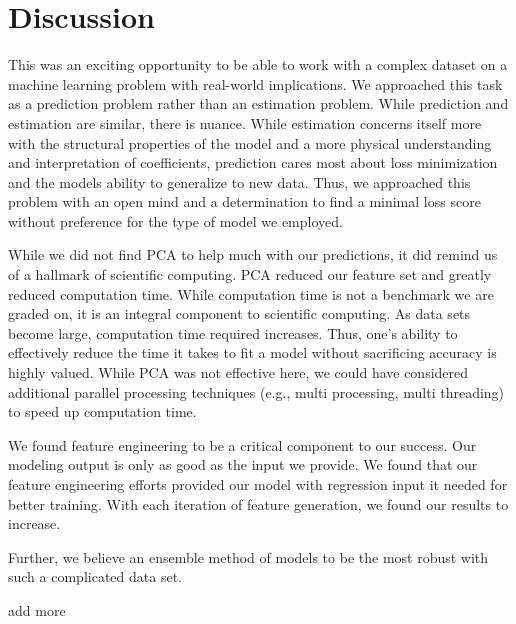 \documentclass[11pt, oneside]{article}   	%
\begin{document}
\section{Discussion}
This was an exciting opportunity to be able to work with a complex dataset on a machine learning problem with real-world implications. We approached this task as a prediction problem rather than an estimation problem. While prediction and estimation are similar, there is nuance. While estimation concerns itself more with the structural properties of the model and a more physical understanding and interpretation of coefficients, prediction cares most about loss minimization and the models ability to generalize to new data. Thus, we approached this problem with an open mind and a determination to find a minimal loss score without preference for the type of model we employed. 

While we did not find PCA to help much with our predictions, it did remind us of a hallmark of scientific computing. PCA reduced our feature set and greatly reduced computation time. While computation time is not a benchmark we are graded on, it is an integral component to scientific computing. As data sets become large, computation time required increases. Thus, one's ability to effectively reduce the time it takes to fit a model without sacrificing accuracy is highly valued. While PCA was not effective here, we could have considered additional parallel processing techniques (e.g., multi processing, multi threading) to speed up computation time. 

We found feature engineering to be a critical component to our success. Our modeling output is only as good as the input we provide. We found that our feature engineering efforts provided our model with regression input it needed for better training. With each iteration of feature generation, we found our results to increase. 

Further, we believe an ensemble method of models to be the most robust with such a complicated data set. 

add more



 
 
\end{document}
